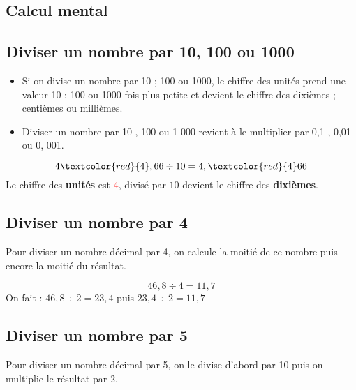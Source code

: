 \begin{pageCours} 

\section{Calcul mental}

\subsection{Diviser un nombre par 10, 100 ou 1000}

\begin{Mt}
\begin{itemize}
\item Si on divise un nombre par 10 ; 100 ou 1000, le chiffre des unités prend une valeur 10 ; 100 ou 1000 fois plus petite et devient le chiffre des dixièmes ; centièmes ou millièmes.
\item Diviser un nombre par 10 , 100 ou 1 000 revient à le multiplier par 0,1 , 0,01 ou 0, 001.
\end{itemize}
\end{Mt}

\begin{Ex}
\[4\textcolor{red}{4},66\div10=4,\textcolor{red}{4}66\]
Le chiffre des \textbf{unités} est \textcolor{red}{$4$}, divisé par $10$ devient le chiffre des \textbf{dixièmes}.
\end{Ex}

\subsection{Diviser un nombre par 4}

\begin{Mt}
Pour diviser un nombre décimal par 4, on calcule la moitié de ce nombre puis encore la moitié du résultat.
\end{Mt}

\begin{Ex}
\[46,8\div4=11,7\]
On fait : $46,8\div2=23,4$ puis $23,4\div2=11,7$
\end{Ex}

\subsection{Diviser un nombre par 5}

\begin{Mt}
Pour diviser un nombre décimal par 5, on le divise d'abord par 10 puis on multiplie le résultat par 2.
\end{Mt}


\end{pageCours}
